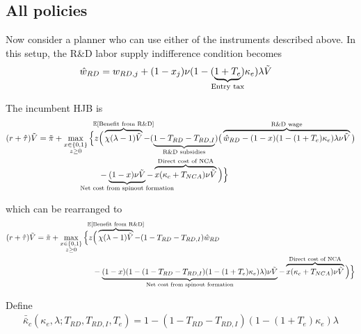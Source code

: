 \documentclass[11pt,english]{article}
\theoremstyle{remark}
\begin{document}
\subsection{All policies}

Now consider a planner who can use either of the instruments described above. In this setup, the R\&D labor supply indifference condition becomes
\begin{align}
\hat{w}_{RD} &= w_{RD,j} + (1-x_j) \nu (1-(\underbrace{1+T_e}_{\mathclap{\text{Entry tax}}})\kappa_e) \lambda \tilde{V} \label{eq:RD_worker_indifference_all}
\end{align}

The incumbent HJB is
\begin{align}
(r + \hat{\tau}) \tilde{V} = \tilde{\pi} + \max_{\substack{x \in \{0,1\} \\ z \ge 0}} \Big\{z &\Big( \overbrace{\chi (\lambda - 1) \tilde{V}}^{\mathclap{\mathbb{E}[\textrm{Benefit from R\&D}]}}-  (\underbrace{1 - T_{RD} - T_{RD,I}}_{\mathclap{\text{R\&D subsidies}}})\big( \overbrace{\hat{w}_{RD} - (1-x)(1-(1+T_e)\kappa_e)\lambda \nu \tilde{V}}^{\mathclap{\text{R\&D wage}}}\big) \label{eq:hjb_incumbent_all} \nonumber \\ 
&-  \underbrace{(1-x) \nu \tilde{V}}_{\mathclap{\text{Net cost from spinout formation}}} - \overbrace{x (\kappa_{c} + T_{NCA}) \nu \tilde{V}}^{\mathclap{\text{Direct cost of NCA}}}\Big) \Big\} 
\end{align}

which can be rearranged to
\begin{align}
(r + \hat{\tau}) \tilde{V} = \tilde{\pi} + \max_{\substack{x \in \{0,1\} \\ z \ge 0}} \Big\{z &\Big( \overbrace{\chi (\lambda - 1) \tilde{V}}^{\mathclap{\mathbb{E}[\textrm{Benefit from R\&D}]}}- (1-T_{RD}- T_{RD,I})\hat{w}_{RD} \\
&-  \underbrace{(1-x)(1 - (1-T_{RD} - T_{RD,I})(1-(1+T_e)\kappa_{e})\lambda)\nu \tilde{V}}_{\mathclap{\text{Net cost from spinout formation}}} - \overbrace{x (\kappa_{c} + T_{NCA}) \nu \tilde{V}}^{\mathclap{\text{Direct cost of NCA}}}\Big) \Big\} \label{eq:hjb_incumbent_all_2}
\end{align}

Define
\begin{align}
\bar{\bar{\kappa}}_c(\kappa_e,\lambda;T_{RD},T_{RD,I},T_e) = 1 - (1-T_{RD} - T_{RD,I})(1-(1+T_e)\kappa_e)\lambda  \label{eq:barkappa_all}
\end{align} 
\end{document}
